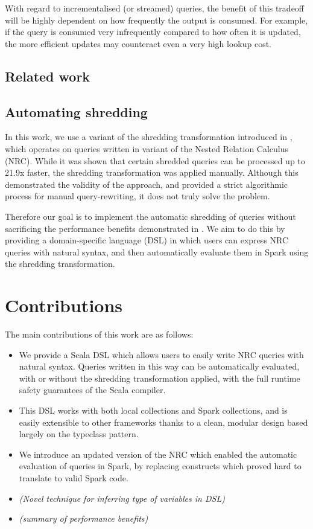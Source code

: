 {With regard to incrementalised (or streamed) queries, the benefit of this tradeoff will be highly dependent on how frequently the output is consumed. For example, if the query is consumed very infrequently compared to how often it is updated, the more efficient updates may counteract even a very high lookup cost.

\subsection{Related work} {}

\subsection{Automating shredding} {
In this work, we use a variant of the shredding transformation introduced in \cite{draftpaper}, which operates on queries written in variant of the Nested Relation Calculus (NRC). While it was shown that certain shredded queries can be processed up to 21.9x faster, the shredding transformation was applied manually. Although this demonstrated the validity of the approach, and provided a strict algorithmic process for manual query-rewriting, it does not truly solve the problem.

Therefore our goal is to implement the automatic shredding of queries without sacrificing the performance benefits demonstrated in \cite{draftpaper}. We aim to do this by providing a domain-specific language (DSL) in which users can express NRC queries with natural syntax, and then automatically evaluate them in Spark using the shredding transformation.
}

}


\section{Contributions} {
The main contributions of this work are as follows:

\begin{itemize}
\item{We provide a Scala DSL which allows users to easily write NRC queries with natural syntax. Queries written in this way can be automatically evaluated, with or without the shredding transformation applied, with the full runtime safety guarantees of the Scala compiler.}
\item{This DSL works with both local collections and Spark collections, and is easily extensible to other frameworks thanks to a clean, modular design based largely on the typeclass pattern.}
\item{We introduce an updated version of the NRC which enabled the automatic evaluation of queries in Spark, by replacing constructs which proved hard to translate to valid Spark code.}
\item{\textit{(Novel technique for inferring type of variables in DSL)}}
\item{\textit{(summary of performance benefits)}}
\end{itemize}
}

